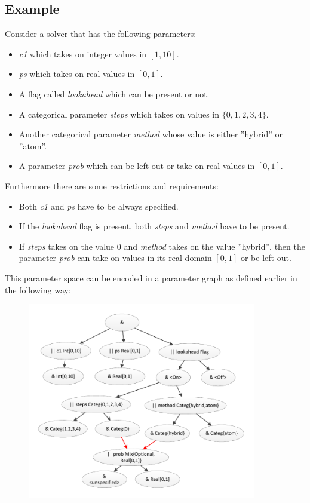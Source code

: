 \newpage

\subsection{Example}
\marginlabel{\Eexample}
Consider a solver that has the following parameters:
\begin{itemize}
\item \textit{c1} which takes on integer values in $[1,10]$.
\item \textit{ps} which takes on real values in $[0,1]$.
\item A flag called \textit{lookahead} which can be present or not.
\item A categorical parameter \textit{steps} which takes on values in $\{0,1,2,3,4\}$.
\item Another categorical parameter \textit{method} whose value is either ''hybrid'' or ''atom''.
\item A parameter \textit{prob} which can be left out or take on real values in $[0,1]$.
\end{itemize}
Furthermore there are some restrictions and requirements:
\begin{itemize}
\item Both \textit{c1} and \textit{ps} have to be always specified.
\item If the \textit{lookahead} flag is present, both \textit{steps} and \textit{method} have to be present.
\item If \textit{steps} takes on the value $0$ and \textit{method} takes on the value ''hybrid'', then the parameter \textit{prob} can take on values in its real domain $[0,1]$ or be left out.
\end{itemize}
This parameter space can be encoded in a parameter graph as defined earlier in the following way:
\begin{figure}[htb]
\includegraphics[width=10cm]{paramgraph.pdf}
\end{figure}

